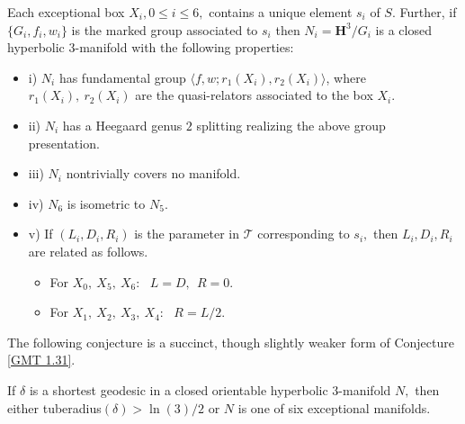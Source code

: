 \begin{conjecture}\label{GMT 1.31}
Each  exceptional 
box $X_i, 0\le i\le 6,$ contains a unique element $s_i$ of $S.$
Further{\textrm ,} if $\{G_i, f_i, w_i\}$ is the marked group
associated to $s_i$ then
$N_i = {\mathbf H}^3/G_i$ is a closed hyperbolic $3$\/{\textrm -}\/manifold
with the following properties\/{\textrm :}
\begin{itemize}
\item{i)} $N_i$ has fundamental group
$\langle f,w;r_1(X_i),r_2(X_i)\rangle${\textrm ,}
where $r_1(X_i),\ r_2(X_i)$ are the quasi\/{\textrm -}\/relators
associated to the box $X_i.$
\item{ii)}  $N_i$ has a Heegaard genus $2$ splitting realizing the above group presentation.

\item{iii)} $N_i$ nontrivially covers no manifold.  

\item{iv)} $N_6$ is isometric to $N_5.$
 
\item{v)} If $(L_i, D_i, R_i)$ is the parameter in ${\mathcal T}$
corresponding to $s_i,$ then $L_i, D_i, R_i$ are related as follows.
\begin{itemize}
\item[] For $X_0,\ X_5,\ X_6:\ \ \ L=D, \ \ R=0.$  

\item[] For $X_1,\ X_2,\ X_3,\ X_4:\ \ \ R=L/2.$
\end{itemize}
\end{itemize}
\end{conjecture}

The following conjecture is a succinct, though slightly weaker
form of Conjecture \ref{GMT 1.31}.

\begin{conjecture}\label{GMT 1.33}
  If $\delta$ is a shortest geodesic in a closed
orientable hyperbolic $3$\/{\textrm -}\/manifold $N,$ then either 
tuberadius$(\delta) > \ln(3)/2$
or $N$ is one of six exceptional manifolds.
\end{conjecture}

